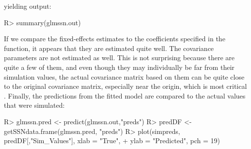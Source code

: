 \documentclass[nojss]{jss}
\renewenvironment{Schunk}{\vspace{\topsep}}{\vspace{\topsep}}
\begin{document}
yielding output:
\begin{Schunk}
\begin{Sinput}
R> summary(glmssn.out)
\end{Sinput}
\end{Schunk}

If we compare the fixed-effects estimates to the coefficients
specified in the  function, it appears that they
are estimated quite well. The covariance parameters are not estimated
as well. This is not surprising because there are quite a few of them,
and even though they may individually be far from their simulation
values, the actual covariance matrix based on them can be quite close
to the original covariance matrix, especially near the origin, which
is most critical \citep{Stei:asym:1988}.  Finally, the predictions
from the fitted model are compared to the actual values that were
simulated:
\begin{Schunk}
\begin{Sinput}
R> glmssn.pred <- predict(glmssn.out,"preds")
R> predDF <- getSSNdata.frame(glmssn.pred, "preds")
R> plot(simpreds, predDF[,"Sim_Values"], xlab = "True",
+     ylab = "Predicted", pch = 19)
\end{Sinput}
\end{Schunk}
\end{document}
